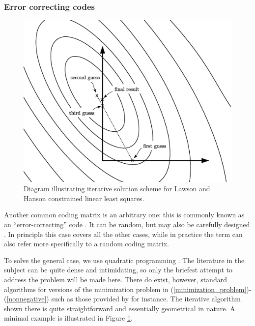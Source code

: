 \subsubsection{Error correcting codes}

\label{error}

\begin{figure}
  \includegraphics[width=1\textwidth]{Lawson_Hanson}
	\caption{Diagram illustrating iterative solution scheme for Lawson and Hanson constrained linear least squares.}\label{Lawson_Hanson_fig}
\end{figure}

Another common coding matrix is an arbitrary one: this is commonly
known as an ``error-correcting'' code \citep{Dietterich_Bakiri1995}.
It can be random, but may also be carefully designed 
\citep{Crammer_Singer2002,Zhou_etal2008,Zhong_Cheriet2013,Rocha_Goldenstein2014}.
In principle this case covers all the other cases, while in practice the
term can also refer more specifically to a random coding matrix.

To solve the general case, we use quadratic programming \citep{Boyd_Vandenberghe2004}.
The literature in the subject can be quite dense and intimidating, so
only the briefest attempt to address the problem will be made here. 
There do exist, however, standard algorithms
for versions of the minimization problem in 
(\ref{minimization_problem})-(\ref{nonnegative})
such as those provided by 
\citet{Lawson_Hanson1995} for instance. 
The iterative algorithm shown there
is quite straightforward and essentially geometrical in nature.
A minimal example is illustrated in Figure \ref{Lawson_Hanson_fig}.

